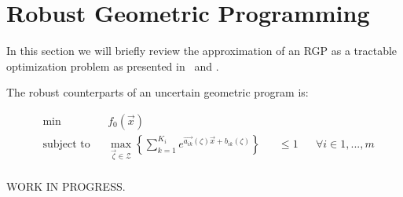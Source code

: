 \section{Robust Geometric Programming} \label{RGP}
In this section we will briefly review the approximation of an RGP as a tractable optimization problem as presented in~\cite{Saab2018} and \cite{hsiung_kim_boyd_2007}.

The robust counterparts of an uncertain geometric program is:

\begin{equation}
\begin{aligned}
& \min &&f_0\left(\vec{x}\right)\\
& \text{subject to} &&\max_{\vec{\zeta} \in \mathcal{Z}} \left\{\textstyle{\sum}_{k=1}^{K_i}e^{\vec{a_{ik}}\left(\zeta\right)\vec{x} + b_{ik}\left(\zeta\right)}\right\} &&\leq 1 &&\forall i \in 1,...,m\\
\end{aligned}
\label{GP_counterparts_finite}
\end{equation}

WORK IN PROGRESS.

